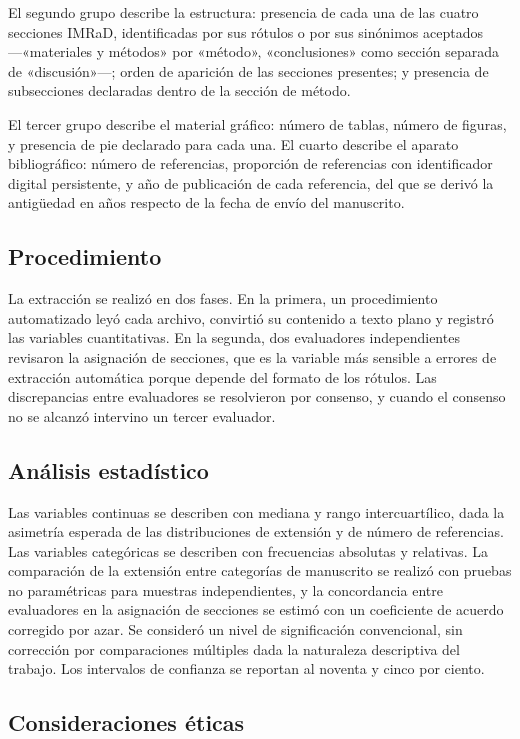 \documentclass{apm-editorial}
\begin{document}
El segundo grupo describe la estructura: presencia de cada una de las
cuatro secciones IMRaD, identificadas por sus rótulos o por sus
sinónimos aceptados —«materiales y métodos» por «método»,
«conclusiones» como sección separada de «discusión»—; orden de
aparición de las secciones presentes; y presencia de subsecciones
declaradas dentro de la sección de método.

El tercer grupo describe el material gráfico: número de tablas, número
de figuras, y presencia de pie declarado para cada una. El cuarto
describe el aparato bibliográfico: número de referencias, proporción de
referencias con identificador digital persistente, y año de publicación
de cada referencia, del que se derivó la antigüedad en años respecto de
la fecha de envío del manuscrito.

\subsection*{Procedimiento}

La extracción se realizó en dos fases. En la primera, un procedimiento
automatizado leyó cada archivo, convirtió su contenido a texto plano y
registró las variables cuantitativas. En la segunda, dos evaluadores
independientes revisaron la asignación de secciones, que es la variable
más sensible a errores de extracción automática porque depende del
formato de los rótulos. Las discrepancias entre evaluadores se
resolvieron por consenso, y cuando el consenso no se alcanzó
intervino un tercer evaluador.

\subsection*{Análisis estadístico}

Las variables continuas se describen con mediana y rango
intercuartílico, dada la asimetría esperada de las distribuciones de
extensión y de número de referencias. Las variables categóricas se
describen con frecuencias absolutas y relativas. La comparación de la
extensión entre categorías de manuscrito se realizó con pruebas no
paramétricas para muestras independientes, y la concordancia entre
evaluadores en la asignación de secciones se estimó con un coeficiente
de acuerdo corregido por azar. Se consideró un nivel de significación
convencional, sin corrección por comparaciones múltiples dada la
naturaleza descriptiva del trabajo. Los intervalos de confianza se
reportan al noventa y cinco por ciento.

\subsection*{Consideraciones éticas}
\end{document}
